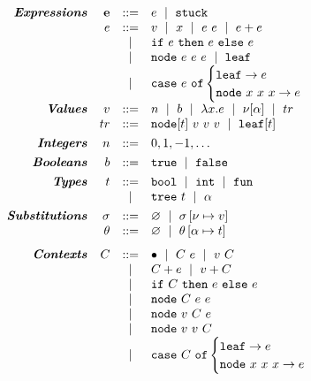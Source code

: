 \begin{figure}
$$
\begin{array}{rrcl}

\emphbf{Expressions}
  & \estuck & ::= & e \spmid \stuck \\
  & e & ::=    & v \spmid x \spmid \eapp{e}{e} \spmid \eplus{e}{e}\\
  &   & \spmid & \eif{e}{e}{e} \\
  &   & \spmid & \enode{e}{e}{e} \spmid \eleaf \\
  &   & \spmid & \ecase{e}{e}{x}{x}{x}{e} \\[0.1in]

\emphbf{Values}
  & v  & ::= & n \spmid b \spmid \efun{x}{e} \spmid \vhole{\thole} \spmid tr \\
  & tr & ::= & \vnode{t}{v}{v}{v} \spmid \vleaf{t} \\[0.05in]

\emphbf{Integers}
  & n & ::= &  0,1,-1,\ldots \\[0.05in]

\emphbf{Booleans}
  & b & ::= &  \etrue \spmid \efalse \\[0.05in]

\emphbf{Types}
  & t & ::=     & \tbool \spmid \tint \spmid \tfun \\
  &   &  \spmid & \ttree{t} \spmid \thole \\[0.05in]

\emphbf{Substitutions}
  & \vsu & ::= & \emptysu \spmid \extendsu{\vsu}{\ehole}{v} \\
  & \tsu & ::= & \emptysu \spmid \extendsu{\tsu}{\thole}{t} \\[0.1in]
\emphbf{Contexts}
  & C
  & ::=
  &   	 \bullet
  \spmid \eapp{C}{e}
  \spmid \eapp{v}{C} \\
  & & \spmid & \eplus{C}{e} \spmid \eplus{v}{C} \\
  & & \spmid & \eif{C}{e}{e} \\
  & & \spmid & \enode{C}{e}{e} \\
  & & \spmid & \enode{v}{C}{e} \\
  & & \spmid & \enode{v}{v}{C} \\
  & & \spmid & \ecase{C}{e}{x}{x}{x}{e}
  \\[0.05in]
\end{array}
$$


\end{figure}
